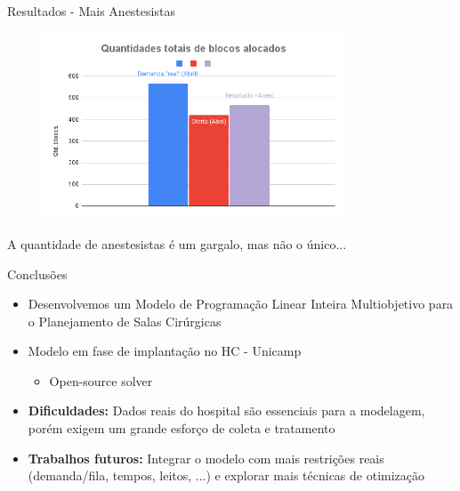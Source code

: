 \documentclass[10pt]{beamer}
\begin{document}
\begin{frame}{Resultados - Mais Anestesistas}
    \begin{figure}
        \centering
        \includegraphics[width=0.8\textwidth]{images/totais_anest.png}
    \end{figure}
    A quantidade de anestesistas é um gargalo, mas não o único...
\end{frame}


\begin{frame}{Conclusões}
    \begin{itemize}
        \setlength\itemsep{1em}
        \item<2-> Desenvolvemos um Modelo de Programação Linear Inteira Multiobjetivo para o Planejamento de Salas Cirúrgicas
        \item<3-> Modelo em fase de implantação no HC - Unicamp
        \begin{itemize}
            \item<4-> Open-source solver
        \end{itemize}
        \item<5-> \textbf{Dificuldades:} Dados reais do hospital são essenciais para a modelagem, porém exigem um grande esforço de coleta e tratamento
        \item<6-> \textbf{Trabalhos futuros:} Integrar o modelo com mais restrições reais (demanda/fila, tempos, leitos, ...) e explorar mais técnicas de otimização
    \end{itemize}
\end{frame}
\end{document}

